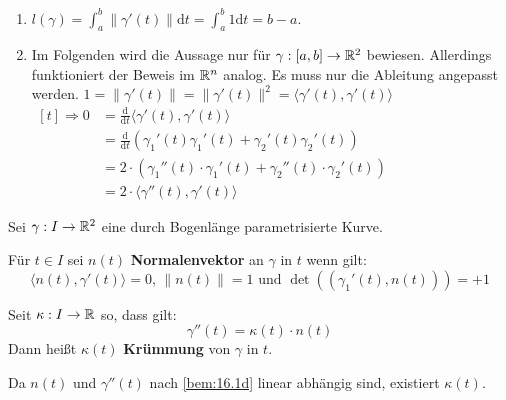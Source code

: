 \begin{beweis}\leavevmode
    \begin{enumerate}[label=\alph*)]
        \item $l(\gamma) = \int_a^b \|\gamma'(t)\| \mathrm{d} t = \int_a^b 1 \mathrm{d} t = b - a$.
        \item Im Folgenden wird die Aussage nur für $\gamma: [a, b] \rightarrow \mathbb{R}^2$ bewiesen.
              Allerdings funktioniert der Beweis im $\mathbb{R}^n$ analog. Es muss nur
              die Ableitung angepasst werden.
            $1 = \|\gamma'(t)\| = \|\gamma'(t)\|^2 = \langle \gamma'(t), \gamma'(t) \rangle$\\
            $\begin{aligned}[t]
                \Rightarrow 0 &= \frac{\mathrm{d}}{\mathrm{d}t} \langle \gamma'(t), \gamma'(t) \rangle\\
                              &= \frac{\mathrm{d}}{\mathrm{d}t} (\gamma_1'(t)\gamma_1'(t) + \gamma_2'(t)\gamma_2'(t))\\
                              &= 2 \cdot (\gamma_1''(t) \cdot \gamma_1'(t) + \gamma_2''(t) \cdot \gamma_2'(t))\\
                              &= 2 \cdot \langle \gamma''(t), \gamma'(t) \rangle
             \end{aligned}$
    \end{enumerate}
\end{beweis}

\begin{definition}%
    Sei $\gamma: I \rightarrow \mathbb{R}^2$ eine durch Bogenlänge
    parametrisierte Kurve.

    \begin{defenum}
        \item Für $t \in I$ sei $n(t)$ \textbf{Normalenvektor}
              an $\gamma$ in $t$ wenn gilt:
              \[\langle n(t), \gamma'(t) \rangle = 0 \text{, } \|n(t)\|=1 \text{ und } \det((\gamma_1'(t), n(t))) = +1\]
        \item Seit $\kappa: I \rightarrow \mathbb{R}$ so, dass gilt:
              \[\gamma''(t) = \kappa(t) \cdot n(t)\]
              Dann heißt $\kappa(t)$ \textbf{Krümmung}
              von $\gamma$ in $t$.
    \end{defenum}
\end{definition}

Da $n(t)$ und $\gamma''(t)$ nach \cref{bem:16.1d} linear
              abhängig sind, existiert $\kappa(t)$.

